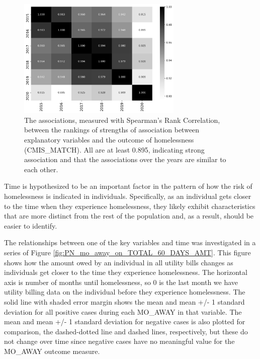 \documentclass[utf8]{frontiersFPHY} %
\begin{document}
\begin{figure}[h]
    \centering
    \includegraphics[width=0.7\textwidth]{../img/corr_years.png}
    \caption[Correlation of variable correlation order by year]{The associations, measured with Spearman's Rank Correlation, between the rankings of strengths of association between explanatory variables and the outcome of homelessness (CMIS\_MATCH). All are at least 0.895, indicating strong association and that the associations over the years are similar to each other.}
    \label{fig:corr_years}
\end{figure}

Time is hypothesized to be an important factor in the pattern of how the risk of homelessness is indicated in individuals. Specifically, as an individual gets closer to the time when they experience homelessness, they likely exhibit characteristics that are more distinct from the rest of the population and, as a result, should be easier to identify. 

The relationships between one of the key variables and time was investigated in a series of Figure \ref{fig:PN_mo_away_on_TOTAL_60_DAYS_AMT}. This figure shows how the amount owed by an individual in all utility bills changes as individuals get closer to the time they experience homelessness. The horizontal axis is number of months until homelessness, so 0 is the last month we have utility billing data on the individual before they experience homelessness. The solid line with shaded error margin shows the mean and mean +/- 1 standard deviation for all positive cases during each MO\_AWAY in that variable. The mean and mean +/- 1 standard deviation for negative cases is also plotted for comparison, the dashed-dotted line and dashed lines, respectively, but these do not change over time since negative cases have no meaningful value for the MO\_AWAY outcome measure.
\end{document}
